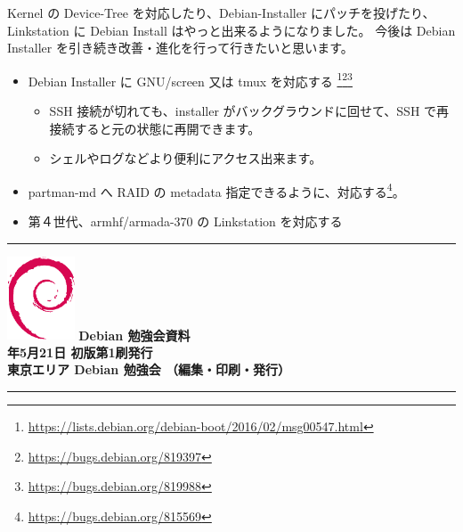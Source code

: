 \documentclass[mingoth,a4paper]{jsarticle}
\newcommand{\debmtgyear}{2016}
\newcommand{\debmtgmonth}{5}
\newcommand{\debmtgdate}{21}
\begin{document}
Kernel の Device-Tree を対応したり、Debian-Installer にパッチを投げたり、Linkstation に Debian Install はやっと出来るようになりました。
今後は Debian Installer を引き続き改善・進化を行って行きたいと思います。
\begin{itemize}
\item Debian Installer に GNU/screen 又は tmux を対応する
\footnote{\url{https://lists.debian.org/debian-boot/2016/02/msg00547.html}}\footnote{\url{https://bugs.debian.org/819397}}\footnote{\url{https://bugs.debian.org/819988}}
	\begin{itemize}
	\item SSH 接続が切れても、installer がバックグラウンドに回せて、SSH で再接続すると元の状態に再開できます。
	\item シェルやログなどより便利にアクセス出来ます。
	\end{itemize}
\item partman-md へ RAID の metadata 指定できるように、対応する\footnote{\url{https://bugs.debian.org/815569}}。
\item 第４世代、armhf/armada-370 の Linkstation を対応する
\end{itemize}


\cleartooddpage

\vspace*{15cm}
\hrule
\vspace{2mm}
\includegraphics[width=2cm]{image200502/openlogo-nd.eps}
\noindent \Large \bf Debian 勉強会資料\\
\noindent \normalfont \debmtgyear{}年\debmtgmonth{}月\debmtgdate{}日 \hspace{5mm}  初版第1刷発行\\
\noindent \normalfont 東京エリア Debian 勉強会 （編集・印刷・発行）\\
\hrule
\end{document}
